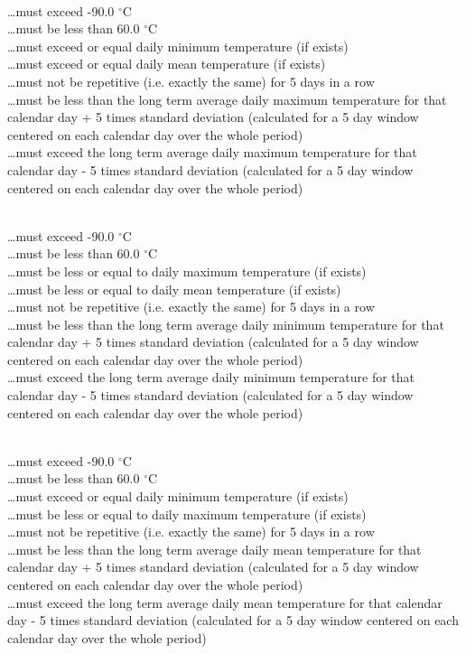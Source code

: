 \documentclass[a4paper,11pt]{article}
\begin{document}
\\
\ldots must exceed -90.0 $^{\circ}$C\\
\ldots must be less than 60.0 $^{\circ}$C\\
\ldots must exceed or equal daily minimum temperature (if exists)\\
\ldots must exceed or equal daily mean temperature (if exists)\\
\ldots must not be repetitive (i.e. exactly the same) for 5 days in a row\\
\ldots must be less than the long term average daily maximum
temperature for that calendar day + 5 times standard deviation
(calculated for a 5 day window centered on each calendar day over the
whole period)\\
\ldots must exceed the long term average daily maximum temperature for
that calendar day - 5 times standard deviation (calculated for a 5 day
window centered on each calendar day over the whole period)
\medskip

\\
\ldots must exceed -90.0 $^{\circ}$C\\
\ldots must be less than 60.0 $^{\circ}$C\\
\ldots must be less or equal to daily maximum temperature (if exists)\\
\ldots must be less or equal to daily mean temperature (if exists)\\
\ldots must not be repetitive (i.e. exactly the same) for 5 days in a row\\
\ldots must be less than the long term average daily minimum
temperature for that calendar day + 5 times standard deviation
(calculated for a 5 day window centered on each calendar day over the
whole period)\\
\ldots must exceed the long term average daily minimum temperature for
that calendar day - 5 times standard deviation (calculated for a 5 day
window centered on each calendar day over the whole period)
\medskip

\\
\ldots must exceed -90.0 $^{\circ}$C\\
\ldots must be less than 60.0 $^{\circ}$C\\
\ldots must exceed or equal daily minimum temperature (if exists)\\
\ldots must be less or equal to daily maximum temperature (if exists)\\
\ldots must not be repetitive (i.e. exactly the same) for 5 days in a row\\
\ldots must be less than the long term average daily mean temperature
for that calendar day + 5 times standard deviation (calculated for a 5
day window centered on each calendar day over the whole period)\\
\ldots must exceed the long term average daily mean temperature for
that calendar day - 5 times standard deviation (calculated for a 5 day
window centered on each calendar day over the whole period)
\medskip
\end{document}

